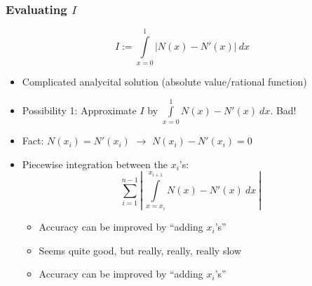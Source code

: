 \documentclass{beamer}
\begin{document}
\begin{frame}
  \frametitle{Evaluating $I$}
  \begin{equation*}
    I := \int\limits_{x=0}^1 | N(x) - N'(x) |\ dx
  \end{equation*}
  \begin{itemize}
  \item Complicated analycital solution (absolute value/rational function)
  \item Possibility 1: Approximate $I$ by $\int\limits_{x=0}^1 N(x) - N'(x) \  dx$. Bad!
  \item Fact: $N(x_i) = N'(x_i)$ 
    $\rightarrow$ $N(x_i) - N'(x_i) = 0$
  \item Piecewise integration between the $x_i$'s:
    \begin{equation*}
      \sum\limits_{i=1}^{n-1} \left|\ \int\limits_{x=x_i}^{x_{i+1}} N(x) - N'(x) \  dx\ \right|
    \end{equation*}
    \begin{itemize}
    \item Accuracy can be improved by ``adding $x_i$'s''
    \item Seems quite good, but really, really, really slow
    \item Accuracy can be improved by ``adding $x_i$'s''
    \end{itemize}
  \end{itemize}
\end{frame}
\end{document}

